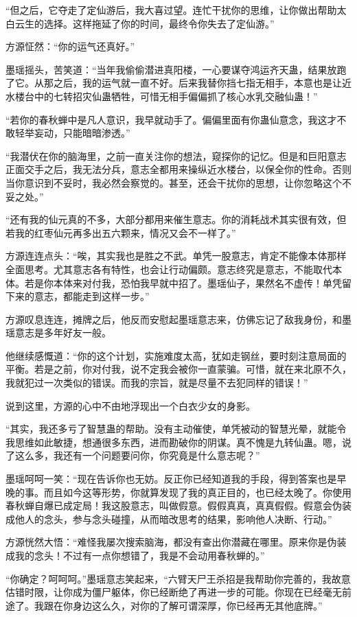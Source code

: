 \begin{this_body}
“但之后，它夺走了定仙游后，我大喜过望。连忙干扰你的思维，让你做出帮助太白云生的选择。这样拖延了你的时间，最终令你失去了定仙游。”

方源怔然：“你的运气还真好。”

墨瑶摇头，苦笑道：“当年我偷偷潜进真阳楼，一心要谋夺鸿运齐天蛊，结果放跑了它。从那之后，我的运气就一直不好。后来我替你挡七指无相手，本意也是让近水楼台中的七转招灾仙蛊牺牲，可惜无相手偏偏抓了核心水乳交融仙蛊！”

“若你的春秋蝉中是凡人意识，我早就动手了。偏偏里面有你蛊仙意念，我这才不敢轻举妄动，只能暗暗渗透。”

“我潜伏在你的脑海里，之前一直关注你的想法，窥探你的记忆。但是和巨阳意志正面交手之后，我无法分兵，意志全都用来操纵近水楼台，以保全你的性命。否则当你意识到不妥时，我必然会察觉的。甚至，还会干扰你的思想，让你忽略这个不妥之处。”

“还有我的仙元真的不多，大部分都用来催生意志。你的消耗战术其实很有效，但若我的红枣仙元再多出五六颗来，情况又会不一样了。”

方源连连点头：“唉，其实我也是胜之不武。单凭一股意志，肯定不能像本体那样全面思考。尤其意志各有特性，也会让行动偏颇。意志终究是意志，不能取代本体。若是你本体来对付我，恐怕我早就中招了。墨瑶仙子，果然名不虚传！单凭留下来的意志，都能走到这样一步。”

方源叹息连连，摊牌之后，他反而安慰起墨瑶意志来，仿佛忘记了敌我身份，和墨瑶意志是多年好友一般。

他继续感慨道：“你的这个计划，实施难度太高，犹如走钢丝，要时刻注意局面的平衡。若是之前，你对付我，说不定我会被你一直蒙骗。可惜，就在来北原不久，我就犯过一次类似的错误。而我的宗旨，就是尽量不去犯同样的错误！”

说到这里，方源的心中不由地浮现出一个白衣少女的身影。

“其实，我还多亏了智慧蛊的帮助。没有主动催使，单凭被动的智慧光晕，就能令我思维如此敏捷，想通很多东西，进而勘破你的阴谋。真不愧是九转仙蛊。嗯，说了这么多，我还有一个问题要问你，你究竟是什么意志呢？”

墨瑶呵呵一笑：“现在告诉你也无妨。反正你已经知道我的手段，得到答案也是早晚的事。而且如今这等形势，你就算发现了我的真正目的，也已经太晚了。你使用春秋蝉自爆已成定局！我这股意志，叫做假意。假假真真，真真假假。假意会伪装成他人的念头，参与念头碰撞，从而暗改思考的结果，影响他人决断、行动。”

方源恍然大悟：“难怪我屡次搜索脑海，都没有查出你潜藏在哪里。原来你是伪装成我的念头！不过有一点你想错了，我是不会动用春秋蝉的。”

“你确定？呵呵呵。”墨瑶意志笑起来，“六臂天尸王杀招是我帮助你完善的，我故意估错时限，让你成为僵尸躯体，你已经断绝了再进一步的可能。你现在已经毫无前途了。我跟在你身边这么久，对你的了解可谓深厚，你已经再无其他底牌。”


\end{this_body}
